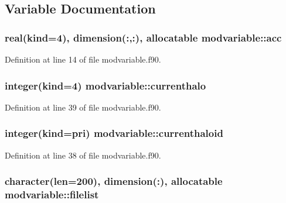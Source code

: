 \subsection{Variable Documentation}
\subsubsection[{\texorpdfstring{acc}{acc}}]{\setlength{\rightskip}{0pt plus 5cm}real(kind=4), dimension(\+:,\+:), allocatable modvariable\+::acc}\hypertarget{namespacemodvariable_a3d403cfbb8c3f6373447b1e6647d7aa7}{}\label{namespacemodvariable_a3d403cfbb8c3f6373447b1e6647d7aa7}


Definition at line 14 of file modvariable.\+f90.

\subsubsection[{\texorpdfstring{currenthalo}{currenthalo}}]{\setlength{\rightskip}{0pt plus 5cm}integer(kind=4) modvariable\+::currenthalo}\hypertarget{namespacemodvariable_af627e6ef340449e8897ec09697c8490c}{}\label{namespacemodvariable_af627e6ef340449e8897ec09697c8490c}


Definition at line 39 of file modvariable.\+f90.

\subsubsection[{\texorpdfstring{currenthaloid}{currenthaloid}}]{\setlength{\rightskip}{0pt plus 5cm}integer(kind={\bf pri}) modvariable\+::currenthaloid}\hypertarget{namespacemodvariable_a2bd6e10da8b4481e4b7731bc57037659}{}\label{namespacemodvariable_a2bd6e10da8b4481e4b7731bc57037659}


Definition at line 38 of file modvariable.\+f90.

\subsubsection[{\texorpdfstring{filelist}{filelist}}]{\setlength{\rightskip}{0pt plus 5cm}character(len=200), dimension(\+:), allocatable modvariable\+::filelist}\hypertarget{namespacemodvariable_a73053f430f8e14a8f6c91851e02ca4c0}{}\label{namespacemodvariable_a73053f430f8e14a8f6c91851e02ca4c0}


